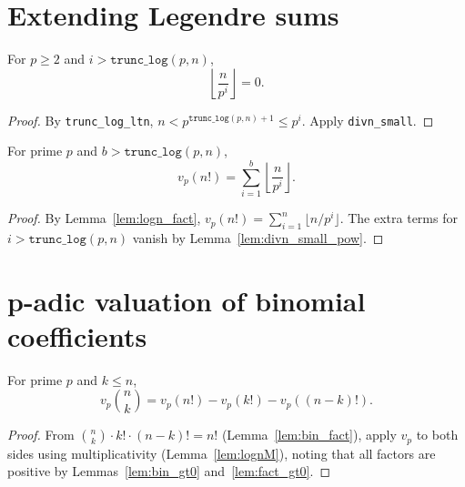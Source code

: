 
\section{Extending Legendre sums}

\begin{lemma}
  \label{lem:divn_small_pow}
  \rocqok
  For $p \geq 2$ and $i > \texttt{trunc\_log}(p, n)$,
  \[
    \left\lfloor \frac{n}{p^i} \right\rfloor = 0.
  \]
  \begin{proof}
    \rocqok
    By \texttt{trunc\_log\_ltn}, $n < p^{\texttt{trunc\_log}(p,n)+1} \leq p^i$.
    Apply \texttt{divn\_small}.
  \end{proof}
\end{lemma}

\begin{lemma}
  \label{lem:logn_fact_ext}
  \rocqok
  For prime $p$ and $b > \texttt{trunc\_log}(p, n)$,
  \[
    v_p(n!) = \sum_{i=1}^{b} \left\lfloor \frac{n}{p^i} \right\rfloor.
  \]
  \begin{proof}
    \rocqok
    By Lemma~\ref{lem:logn_fact}, $v_p(n!) = \sum_{i=1}^{n} \lfloor n/p^i \rfloor$.
    The extra terms for $i > \texttt{trunc\_log}(p,n)$ vanish by
    Lemma~\ref{lem:divn_small_pow}.
  \end{proof}
\end{lemma}

\section{p-adic valuation of binomial coefficients}

\begin{lemma}
  \label{lem:logn_bin}
  \rocqok
  For prime $p$ and $k \leq n$,
  \[
    v_p\!\binom{n}{k} = v_p(n!) - v_p(k!) - v_p((n-k)!).
  \]
  \begin{proof}
    \rocqok
    From $\binom{n}{k} \cdot k! \cdot (n-k)! = n!$
    (Lemma~\ref{lem:bin_fact}), apply $v_p$ to both sides using
    multiplicativity (Lemma~\ref{lem:lognM}), noting that all factors
    are positive by Lemmas~\ref{lem:bin_gt0} and~\ref{lem:fact_gt0}.
  \end{proof}
\end{lemma}

